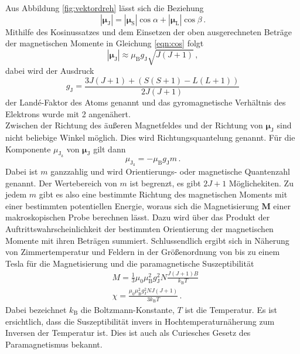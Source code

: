 Aus Abbildung \ref{fig:vektordreh} lässt sich die Beziehung
\begin{equation}
  |\symbf{\mu}_{\text{J}}| = |\symbf{\mu}_{\text{S}}| \cos\alpha + |\symbf{\mu}_{\text{L}}| \cos\beta\,.
  \label{eqn:cos}
\end{equation}
Mithilfe des Kosinussatzes und dem Einsetzen der oben ausgerechneten Beträge der magnetischen Momente in Gleichung
\ref{eqn:cos} folgt
\begin{equation}
  |\symbf{\mu}_{\text{J}}| \approx \mu_{\text{B}} g_{\text{J}} \sqrt{J(J+1)}\,,
\end{equation}
dabei wird der Ausdruck
\begin{equation}
  g_{\text{J}} = \frac{3J(J+1) + (S(S+1)-L(L+1))}{2J(J+1)}
  \label{eqn:lande}
\end{equation}
der Landé-Faktor des Atoms genannt und das gyromagnetische Verhältnis des Elektrons wurde
mit 2 angenähert. \\
Zwischen der Richtung des äußeren Magnetfeldes und der Richtung von $\symbf{\mu}_{\text{J}}$
sind nicht beliebige Winkel möglich. Dies wird Richtungsquantelung genannt. Für die Komponente
$\mu_{\text{J}_{\text{z}}}$ von $\symbf{\mu}_{\text{J}}$ gilt dann
\begin{equation}
  \mu_{\text{J}_{\text{z}}} = - \mu_{\text{B}} g_{\text{J}} m\,.
\end{equation}
Dabei ist $m$ ganzzahlig und wird Orientierungs- oder magnetische Quantenzahl genannt.
Der Wertebereich von $m$ ist begrenzt, es gibt $2J+1$ Möglichekiten. Zu jedem $m$ gibt es also eine bestimmte Richtung
des magnetischen Moments mit einer bestimmten potentiellen Energie, woraus sich die
Magnetisierung $\symbf{M}$ einer makroskopischen Probe berechnen lässt.
Dazu wird über das Produkt der Auftrittswahrscheinlichkeit der bestimmten
Orientierung der magnetischen Momente mit ihren Beträgen summiert.
Schlussendlich ergibt sich in Näherung von Zimmertemperatur und Feldern in der Größenordnung
von bis zu einem Tesla für die Magnetisierung und die paramagnetische Suszeptibilität
\begin{align}
  &M = \frac{1}{3} \mu_0 \mu_{\text{B}}^2 g_{\text{J}}^2 N \frac{J(J+1)B}{k_\text{B}T} \,\\
  &\chi = \frac{\mu_0 \mu_{\text{B}}^2 g_{\text{J}}^2 N J (J+1)}{3 k_{\text{B}} T}\,.
  \label{eqn:theoriewert}
\end{align}
Dabei bezeichnet $k_\text{B}$ die Boltzmann-Konstante, $T$ ist die Temperatur.
Es ist ersichtlich, dass die Suszeptibilität invers in Hochtemperaturnäherung
zum Inversen der Temperatur ist. Dies ist auch als Curiesches Gesetz des Paramagnetismus bekannt.

